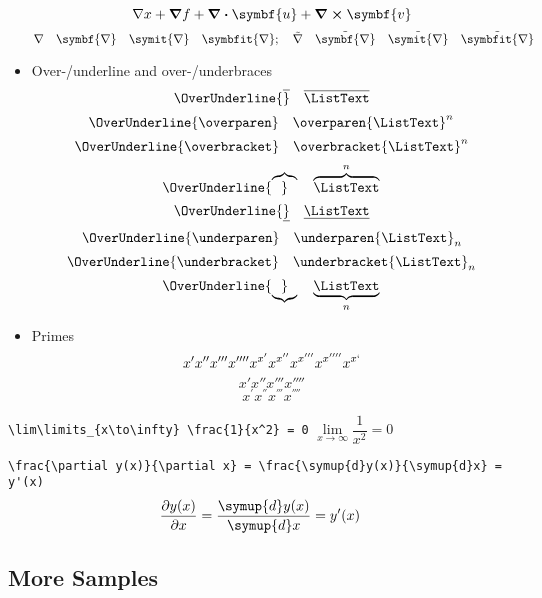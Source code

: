 \documentclass[english,log-declarations=false]{article}
\begin{document}
\begin{itemize}
        \[ \nabla x + \grad{f} + \divergence{\symbf{u}} + \curl{\symbf{v}} \]
        \[
          \nabla                 \quad \symbf{\nabla}           \quad
          \symit{\nabla}         \quad \symbfit{\nabla};        \quad
          \tilde{\nabla}         \quad \tilde{\symbf{\nabla}}   \quad
          \tilde{\symit{\nabla}} \quad \tilde{\symbfit{\nabla}}
        \]
  \item Over-/underline and over-/underbraces
        \[ \OverUnderline{\overline}     \quad \overline     {\ListText}   \]
        \[ \OverUnderline{\overparen}    \quad \overparen    {\ListText}^n \]
        \[ \OverUnderline{\overbracket}  \quad \overbracket  {\ListText}^n \]
        \[ \OverUnderline{\overbrace}    \quad \overbrace    {\ListText}^n \]
        \[ \OverUnderline{\underline}    \quad \underline    {\ListText}   \]
        \[ \OverUnderline{\underparen}   \quad \underparen   {\ListText}_n \]
        \[ \OverUnderline{\underbracket} \quad \underbracket {\ListText}_n \]
        \[ \OverUnderline{\underbrace}   \quad \underbrace   {\ListText}_n \]
  \item Primes
        \[ x' x'' x''' x''''  x^{x'} x^{x''} x^{x'''} x^{x''''} x^{x`} \]
        \[ x \prime x \dprime x \trprime x \qprime \]
        \[ x^{\prime} x^{\dprime} x^{\trprime} x^{\qprime} \] %
\end{itemize}

\verb|\lim\limits_{x\to\infty} \frac{1}{x^2} = 0| $ \lim\limits_{x\to\infty} \dfrac{1}{x^2} = 0 $

\verb|\frac{\partial y(x)}{\partial x} = \frac{\symup{d}y(x)}{\symup{d}x} = y'(x)|
\[ \frac{\partial y(x)}{\partial x} = \frac{\symup{d}y(x)}{\symup{d}x} = y'(x) \]



\iffalse
\subsection{More Samples}

\def\ee{\mathrm{e}}
\def\ii{\mathrm{i}}
\def\bm{\symbf}
\newcommand\innerprod[2]{\left\langle{#1}\middle\vert{#2}\right\rangle}
\newcommand\brakket[3]{\left\langle{#1}\middle\vert{#2}\middle\vert{#3}\right\rangle}
\end{document}
